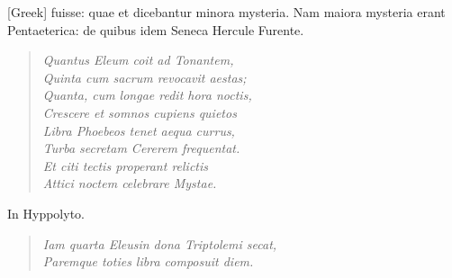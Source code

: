  \textgreek{[Greek]}
fuisse: quae et dicebantur minora mysteria.
Nam maiora mysteria
erant Pentaeterica: de quibus idem Seneca Hercule Furente.
\begin{quote}
  \emph{Quantus Eleum coit ad Tonantem,\\
  Quinta cum sacrum revocavit aestas;\\
  Quanta, cum longae redit hora noctis,\\
  Crescere et somnos cupiens quietos\\
  Libra Phoebeos tenet aequa currus,\\
  Turba secretam Cererem frequentat.\\
  Et citi tectis properant relictis\\
  Attici noctem celebrare Mystae.}
\end{quote}

In Hyppolyto.
\begin{quote}
  \emph{Iam quarta Eleusin dona Triptolemi secat,\\
  Paremque toties libra composuit diem.}
\end{quote}

